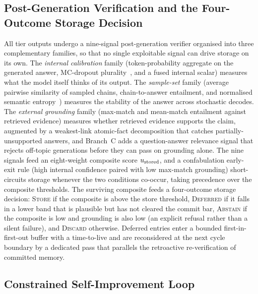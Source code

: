 \subsection{Post-Generation Verification and the Four-Outcome Storage Decision}

All tier outputs undergo a nine-signal post-generation verifier organised into three complementary families, so that no single exploitable signal can drive storage on its own. The \textit{internal calibration} family (token-probability aggregate on the generated answer, MC-dropout plurality~\cite{pmlr-v48-gal16}, and a fused internal scalar) measures what the model itself thinks of its output. The \textit{sample-set} family (average pairwise similarity of sampled chains, chain-to-answer entailment, and normalised semantic entropy~\cite{farquhar2024semantic}) measures the stability of the answer across stochastic decodes. The \textit{external grounding} family (max-match and mean-match entailment against retrieved evidence) measures whether retrieved evidence supports the claim, augmented by a weakest-link atomic-fact decomposition that catches partially-unsupported answers, and Branch~C adds a question-answer relevance signal that rejects off-topic generations before they can pass on grounding alone. The nine signals feed an eight-weight composite score $u_{\text{stored}}$, and a confabulation early-exit rule (high internal confidence paired with low max-match grounding) short-circuits storage whenever the two conditions co-occur, taking precedence over the composite thresholds. The surviving composite feeds a four-outcome storage decision: \textsc{Store} if the composite is above the store threshold, \textsc{Deferred} if it falls in a lower band that is plausible but has not cleared the commit bar, \textsc{Abstain} if the composite is low and grounding is also low (an explicit refusal rather than a silent failure), and \textsc{Discard} otherwise. Deferred entries enter a bounded first-in-first-out buffer with a time-to-live and are reconsidered at the next cycle boundary by a dedicated pass that parallels the retroactive re-verification of committed memory.

\subsection{Constrained Self-Improvement Loop}

